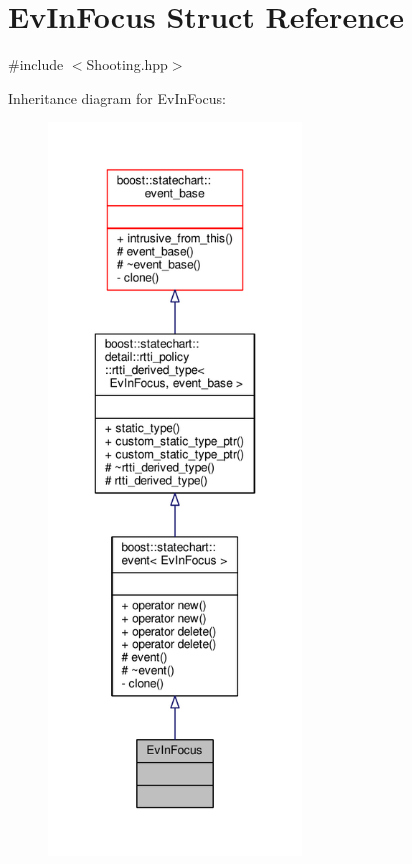 \hypertarget{struct_ev_in_focus}{}\section{Ev\+In\+Focus Struct Reference}
\label{struct_ev_in_focus}


{\ttfamily \#include $<$Shooting.\+hpp$>$}



Inheritance diagram for Ev\+In\+Focus\+:
\nopagebreak
\begin{figure}[H]
\begin{center}
\leavevmode
\includegraphics[height=550pt]{struct_ev_in_focus__inherit__graph}
\end{center}
\end{figure}


